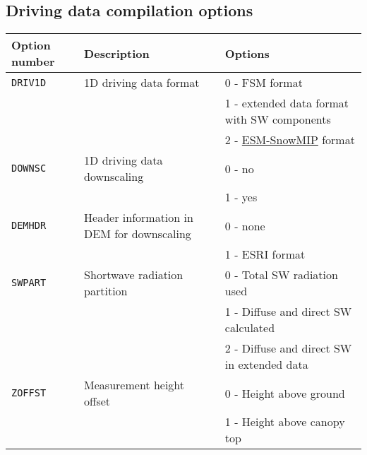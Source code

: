 \documentclass{article}
\begin{document}
\subsection{Driving data compilation options }
\begin{longtable}{|l|l|l|}
\hline
Option number & Description & Options \\
\hline
{\tt DRIV1D} & 1D driving data format
&   0 - FSM format \\
& & 1 - extended data format with SW components\\
& & 2 - \href{https://www.geos.ed.ac.uk/~ressery/ESM-SnowMIP/ESMSnowMIP_Reference_sites.pdf}{ESM-SnowMIP} format \\
\hline
{\tt DOWNSC} & 1D driving data downscaling
&   0 - no \\
& & 1 - yes \\
\hline
{\tt DEMHDR} & Header information in DEM for downscaling
&   0 - none \\
& & 1 - ESRI format \\
\hline
{\tt SWPART} & Shortwave radiation partition
&   0 - Total SW radiation used \\
& & 1 - Diffuse and direct SW calculated \\
& & 2 - Diffuse and direct SW in extended data \\
\hline
{\tt ZOFFST} & Measurement height offset
&   0 - Height above ground \\
& & 1 - Height above canopy top \\
\hline
\end{longtable}
\end{document}
